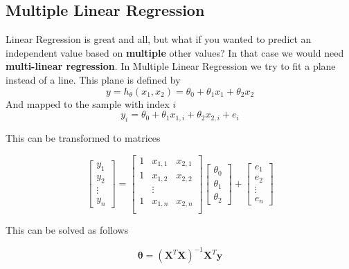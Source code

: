 \documentclass[11pt]{article}
\begin{document}
\subsection{Multiple Linear Regression}

Linear Regression is great and all, but what if you wanted to predict an independent value based on \textbf{multiple} other values? In that case we would need \textbf{multi-linear regression}.
\noindent
In Multiple Linear Regression we try to fit a plane instead of a line. This plane is defined by
\begin{equation}
    y = h_\theta(x_1,x_2) = \theta_0 + \theta_1 x_1 + \theta_2 x_2
\end{equation}
And mapped to the sample with index $i$
\begin{equation*}
    y_i = \theta_0 + \theta_1 x_{1,i} + \theta_2 x_{2,i} + e_i
\end{equation*}

This can be transformed to matrices

\begin{equation*}
    \begin{bmatrix}
        y_1    \\
        y_2    \\
        \vdots \\
        y_n
    \end{bmatrix}
    =
    \begin{bmatrix}
        1 & x_{1,1} & x_{2,1} \\
        1 & x_{1,2} & x_{2,2} \\
          & \vdots  &         \\
        1 & x_{1,n} & x_{2,n} \\
    \end{bmatrix}
    \begin{bmatrix}
        \theta_0 \\
        \theta_1 \\
        \theta_2
    \end{bmatrix}
    +
    \begin{bmatrix}
        e_1    \\
        e_2    \\
        \vdots \\
        e_n
    \end{bmatrix}
\end{equation*}

This can be solved as follows

\begin{equation*}
    \bm{\theta} = (\bm{X}^T\bm{X})^{-1}\bm{X}^T\bm{y}
\end{equation*}
\end{document}
